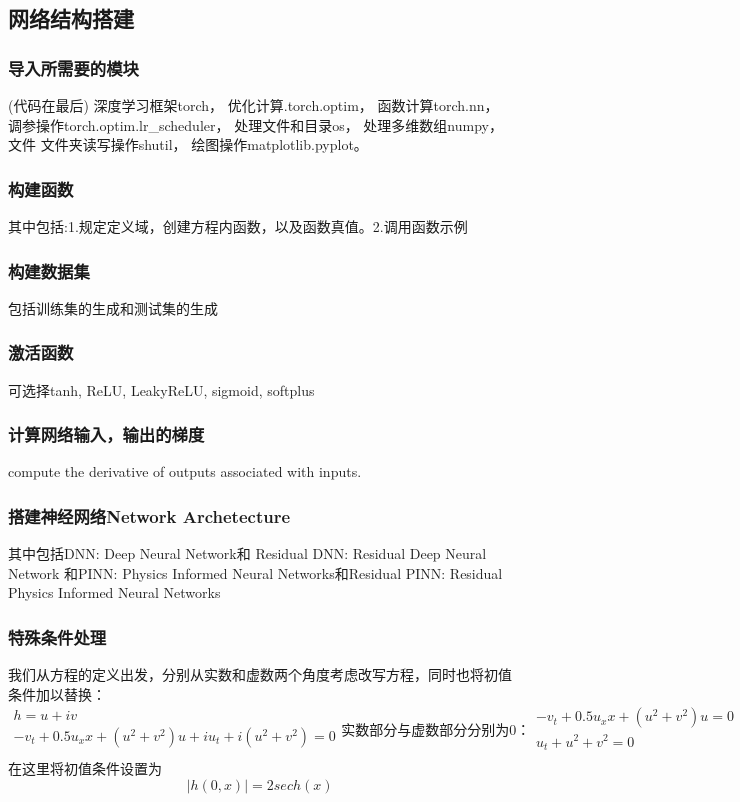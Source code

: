 \documentclass[addpoints,answers]{exam}
\begin{document}
   \subsection{网络结构搭建}
   \subsubsection{导入所需要的模块}
   (代码在最后)
   深度学习框架torch，
   优化计算.torch.optim，
   函数计算torch.nn，
   调参操作torch.optim.lr\_scheduler，
   处理文件和目录os，
   处理多维数组numpy，
   文件 文件夹读写操作shutil，
   绘图操作matplotlib.pyplot。
   \subsubsection{构建函数}
   其中包括:1.规定定义域，创建方程内函数，以及函数真值。2.调用函数示例
   \subsubsection{构建数据集}
   包括训练集的生成和测试集的生成
   \subsubsection{激活函数}
   可选择tanh, ReLU, LeakyReLU, sigmoid, softplus
   \subsubsection{计算网络输入，输出的梯度}
   compute the derivative of outputs associated with inputs.
   \subsubsection{搭建神经网络Network Archetecture}
   其中包括DNN: Deep Neural Network和 Residual DNN: Residual Deep Neural Network 和PINN: Physics Informed Neural Networks和Residual PINN: Residual Physics Informed Neural Networks
  
   \subsubsection{特殊条件处理} 我们从方程的定义出发，分别从实数和虚数两个角度考虑改写方程，同时也将初值条件加以替换：
   \begin{subequations}\label{eq:ac}
    \begin{gather*}
    h = u + iv\\
    - v_t + 0.5u_x x + (u^2 + v^2)u +i u_t + i(u^2  + v^2) = 0\\
    \end{gather*}    
    实数部分与虚数部分分别为0：
    \begin{gather*}
    - v_t + 0.5u_x x + (u^2 + v^2)u = 0\\
    u_t + u^2  + v^2 = 0\\
    \end{gather*}
  \end{subequations}
    在这里将初值条件设置为$$\mid h(0,x) \mid = 2sech(x)$$
\end{document}
